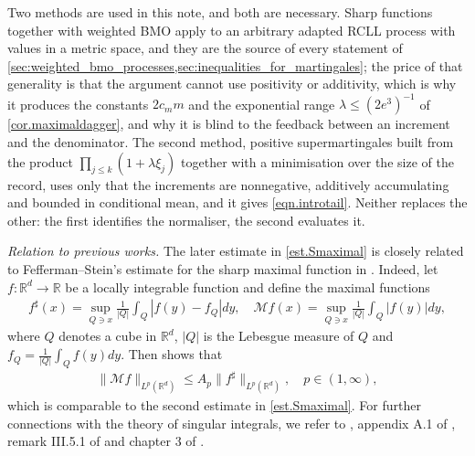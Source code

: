 \documentclass[12pt,oneside,reqno,fleqn]{amsart}
\numberwithin{equation}{section}
\theoremstyle{remark}
\newcommand\cmm{{\mathcal M}}
\newcommand{\R}{{\mathbb R}}
\newcommand{\Rd}{{\R^d}}
\newcommand{\1}{{\mathbf 1}}
\renewcommand{\le}{\leq}
\begin{document}
	Two methods are used in this note, and both are necessary. Sharp functions together with weighted BMO apply to an arbitrary adapted RCLL process with values in a metric space, and they are the source of every statement of \cref{sec:weighted_bmo_processes,sec:inequalities_for_martingales}; the price of that generality is that the argument cannot use positivity or additivity, which is why it produces the constants $2c_mm$ and the exponential range $\lambda\le(2e^3)^{-1}$ of \cref{cor.maximaldagger}, and why it is blind to the feedback between an increment and the denominator. The second method, positive supermartingales built from the product $\prod_{j\le k}(1+\lambda\xi_j)$ together with a minimisation over the size of the record, uses only that the increments are nonnegative, additively accumulating and bounded in conditional mean, and it gives \eqref{eqn.introtail}. Neither replaces the other: the first identifies the normaliser, the second evaluates it.


	\textit{Relation to previous works.}
	The later estimate in \eqref{est.Smaximal} is closely related to  Fefferman--Stein's estimate for the sharp maximal function in \cite{MR447953}. Indeed, let $f:\Rd\to\R$ be a locally integrable function and define the  maximal functions
	\begin{align*}
		f^\sharp(x)=\sup_{Q\ni x}\frac1{|Q|}\int_{Q}|f(y)-f_Q|dy, \quad \cmm f(x)=\sup_{Q\ni x}\frac1{|Q|}\int_{Q}|f(y)|dy,
	\end{align*}
	where  $Q$ denotes a cube in $\Rd$, $|Q|$ is the Lebesgue measure of $Q$ and $f_Q=\frac1{|Q|}\int_Qf(y)dy$. Then \cite[Theorem 5]{MR447953} shows that
	\begin{align*}
		\|\cmm f\|_{L^p(\Rd)}\le A_p\|f^\sharp\|_{L^p(\Rd)}, \quad p\in(1,\infty),
	\end{align*}
	which is comparable to the second estimate in \eqref{est.Smaximal}.
	For further connections with the theory of singular integrals, we refer to \cite{MR447953,MR341601}, appendix A.1 of \cite{MR2190038},  remark III.5.1 of \cite{MR0448538} and chapter 3 of \cite{MR3617205}.
\end{document}
